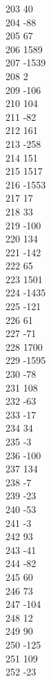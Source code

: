 { 203	40 \\
 204	-88 \\
 205	67 \\
 206	1589 \\
 207	-1539 \\
 208	2 \\
 209	-106 \\
 210	104 \\
 211	-82 \\
 212	161 \\
 213	-258 \\
 214	151 \\
 215	1517 \\
 216	-1553 \\
 217	17 \\
 218	33 \\
 219	-100 \\
 220	134 \\
 221	-142 \\
 222	65 \\
 223	1501 \\
 224	-1435 \\
 225	-121 \\
 226	61 \\
 227	-71 \\
 228	1700 \\
 229	-1595 \\
 230	-78 \\
 231	108 \\
 232	-63 \\
 233	-17 \\
 234	34 \\
 235	-3 \\
 236	-100 \\
 237	134 \\
 238	-7 \\
 239	-23 \\
 240	-53 \\
 241	-3 \\
 242	93 \\
 243	-41 \\
 244	-82 \\
 245	60 \\
 246	73 \\
 247	-104 \\
 248	12 \\
 249	90 \\
 250	-125 \\
 251	109 \\
 252	-23 \\
}
